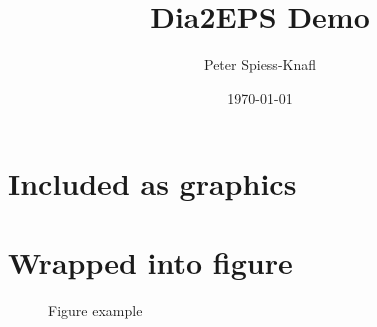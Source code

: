 \documentclass[11pt]{scrartcl}
\title{\textbf{Dia2EPS Demo}}
\author{Peter Spiess-Knafl}
\date{\today}
\begin{document}
\maketitle

\section{Included as graphics}


\section{Wrapped into figure}
\begin{figure}[h]
\centering
{}
\caption{Figure example}
\end{figure}
\end{document}
